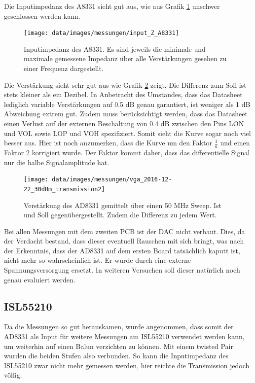 \newpage
Die Inputimpedanz des A8331 sieht gut aus, wie aus Grafik \ref{fig:Z_in_A8331} unschwer geschlossen werden kann.

\begin{figure}[H]
\begin{center}
    \texttt{[image: data/images/messungen/input\_Z\_A8331]}
    \caption{Inputimpedanz des A8331. Es sind jeweils die minimale und maximale gemessene Impedanz über alle Verstärkungen gesehen zu einer Frequenz dargestellt.}
    \label{fig:Z_in_A8331}
\end{center}
\end{figure}

\newpage
Die Verstärkung sieht sehr gut aus wie Grafik \ref{fig:T_A8331} zeigt. Die Differenz zum Soll ist stets kleiner als ein Dezibel. In Anbetracht des Umstandes, dass das Datasheet lediglich variable Verstärkungen auf 0.5 dB genau garantiert, ist weniger als 1 dB Abweichung extrem gut. Zudem muss berücksichtigt werden, dass das Datasheet einen Verlust auf der externen Beschaltung von 0.4 dB zwischen den Pins LON und VOL sowie LOP und VOH spezifiziert.
Somit sieht die Kurve sogar noch viel besser aus.
Hier ist noch anzumerken, dass die Kurve um den Faktor $\frac{1}{a}$ und einen Faktor 2 korrigiert wurde. Der Faktor kommt daher, dass das differentielle Signal nur die halbe Signalamplitude hat. 

\begin{figure}[H]
\begin{center}
    \texttt{[image: data/images/messungen/vga\_2016-12-22\_30dBm\_transmission2]}
    \caption{Verstärkung des AD8331 gemittelt über einen 50 MHz Sweep. Ist und Soll gegenübergestellt. Zudem die Differenz zu jedem Wert.}
    \label{fig:T_A8331}
\end{center}
\end{figure}

Bei allen Messungen mit dem zweiten PCB ist der DAC nicht verbaut. Dies, da der Verdacht bestand, dass dieser eventuell Rauschen mit sich bringt, was nach der Erkenntnis, dass der AD8331 auf dem ersten Board tatsächlich kaputt ist, nicht mehr so wahrscheinlich ist. Er wurde durch eine externe Spannungsversorgung ersetzt. In weiteren Versuchen soll dieser natürlich noch genau evaluiert werden.

\newpage
\subsection{ISL55210}

Da die Messungen so gut herauskamen, wurde angenommen, dass somit der AD8331 als Input für weitere Messungen am ISL55210 verwendet werden kann, um weiterhin auf einen Balun verzichten zu können. Mit einem twisted Pair wurden die beiden Stufen also verbunden. So kann die Inputimpedanz des ISL55210 zwar nicht mehr gemessen werden, hier reichte die Transmission jedoch völlig.

